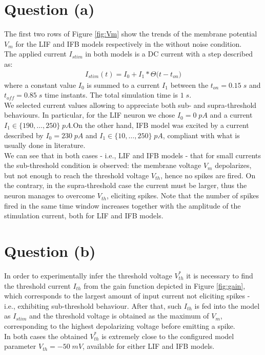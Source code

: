 \documentclass[11pt]{article}
\begin{document}
\section*{Question (a)}
The first two rows of Figure \ref{fig:Vm} show the trends
of the membrane potential \(V_{m}\) for the LIF and IFB models respectively in
the without noise condition.\\
The applied current \(I_{stim}\) in both models is a DC current with a step described as:
\begin{align*}
    I_{stim}(t) = I_0+I_1*\Theta\bigl(t-t_{on}\bigr)
\end{align*}
where a constant value \(I_{0}\) is summed to a current \(I_{1}\) between the \(t_{on}=0.15\;s\)
and \(t_{off}=0.85\;s\) time instants. The total simulation time is \(1\;s\).\\
We selected current values allowing to appreciate both sub- and supra-threshold behaviours.
In particular, for the LIF neuron we chose \(I_0=0\;pA\) and a current
\(I_1\in\{190,\dots{,250}\}\;pA\).On the other hand, IFB model was excited by
a current described by \(I_0=230\;pA\) and \(I_1\in\{10,\dots{,250}\}\;pA\), compliant
with what is usually done in literature.\\

We can see that in both cases - i.e., LIF and IFB models - that for small currents
the sub-threshold condition is observed: the membrane voltage \(V_{m}\) depolarizes, but
not enough to reach the threshold voltage \(V_{th}\), hence no spikes are fired.
On the contrary, in the supra-threshold case the current must be larger, thus the neuron 
manages to overcome \(V_{th}\), eliciting spikes. 
Note that the number of spikes fired in the same time window increases together with the 
amplitude of the stimulation current, both for LIF and IFB models.

\section*{Question (b)}
In order to experimentally infer the threshold voltage \(V_{th}^{*}\) it is
necessary to find the threshold current \(I_{th}\) from the gain function
depicted in Figure \ref{fig:gain},
which corresponds to the largest amount of input current not eliciting
spikes - i.e., exhibiting sub-threshold behaviour. After that,
such \(I_{th}\) is fed into the model as \(I_{stim}\) and the threshold voltage
is obtained as the maximum of \(V_{m}\), corresponding to the highest
depolarizing voltage before emitting a spike.\\
In both cases the obtained \(V_{th}^{*}\) is extremely close to the configured
model parameter \(V_{th}=-50\;mV\), available for either LIF and IFB models.
\end{document}
